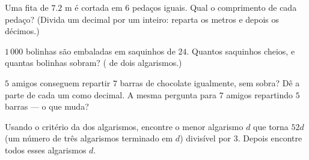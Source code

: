 \begin{exercise}[$\star$]\label{exo:g5:division:8}
Uma fita de $7.2$ m é cortada em $6$ pedaços iguais. Qual o
comprimento de cada pedaço? (Divida um decimal por um inteiro:
reparta os metros e depois os décimos.)
\end{exercise}

\begin{exercise}[$\star$]\label{exo:g5:division:9}
$1\,000$ bolinhas são embaladas em saquinhos de $24$. Quantos
saquinhos cheios, e quantas bolinhas sobram? ( de dois
algarismos.)
\end{exercise}

\begin{exercise}[$\star\star$]\label{exo:g5:division:10}
$5$ amigos conseguem repartir $7$ barras de chocolate igualmente, sem
sobra? Dê a parte de cada um como decimal. A mesma pergunta para $7$
amigos repartindo $5$ barras --- o que muda?
\end{exercise}

\begin{exercise}[$\star\star$]\label{exo:g5:division:11}
Usando o critério da  dos algarismos, encontre o menor algarismo
$d$ que torna $52d$ (um número de três algarismos terminado em $d$)
divisível por $3$. Depois encontre todos esses algarismos $d$.
\end{exercise}
